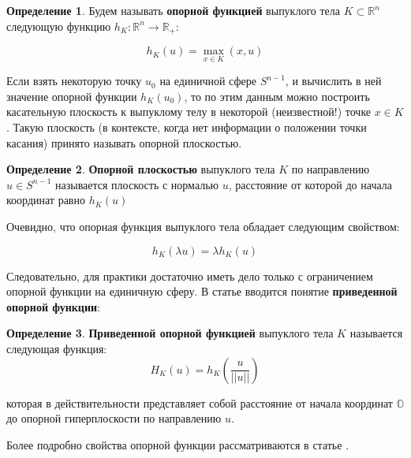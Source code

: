 \documentclass[a4paper, 12pt, titlepage]{article}
\theoremstyle{definition}
\newtheorem{SmartDefinition}{Определение}
\theoremstyle{plain}
\theoremstyle{plain}
\begin{document}
\begin{SmartDefinition}
 \label{def:support-function}
 Будем называть \textbf{опорной функцией} выпуклого тела
 $K \subset \mathbb{R}^{n}$ следующую функцию
 $h_{K}: \mathbb{R}^{n} \to \mathbb{R}_{+}$:

 \begin{equation}h_{K}(u) = \max \limits_{x \in K}(x, u)\end{equation}
\end{SmartDefinition}

Если взять некоторую точку $u_{0}$ на единичной сфере $S^{n - 1}$, и вычислить
в ней значение опорной функции $h_{K}(u_{0})$, то по этим данным можно
построить касательную плоскость к выпуклому телу в некоторой (неизвестной!)
точке $x \in K$. Такую плоскость (в контексте, когда нет информации о положении
точки касания) принято называть опорной плоскостью.

\begin{SmartDefinition}
 \label{def:support-plane}
 \textbf{Опорной плоскостью} выпуклого тела $K$ по
 направлению $u \in S^{n - 1}$ называется плоскость с нормалью $u$, расстояние
 от которой до начала координат равно $h_{K}(u)$
\end{SmartDefinition}

Очевидно, что опорная функция выпуклого тела обладает следующим свойством:

\begin{equation}
 h_{K}(\lambda u) = \lambda h_{K}(u)
\end{equation}

Следовательно, для практики достаточно иметь дело только с ограничением опорной
функции на единичную сферу. В статье \cite{journals/jmiv/KarlKVW96} вводится
понятие \textbf{приведенной опорной функции}:

\begin{SmartDefinition}
 \label{def:support-plane}
 \textbf{Приведенной опорной функцией} выпуклого тела $K$ называется следующая
функция:
 \begin{equation}
 H_{K} (u) = h_{K} \left(\frac{u}{||u||}\right)
 \end{equation}
\end{SmartDefinition}

которая в действительности представляет собой расстояние от начала координат
$\mathbb{O}$ до опорной гиперплоскости по направлению $u$.

Более подробно свойства опорной функции рассматриваются в статье
\cite{journals/cviu/GhoshK98}.
\end{document}
